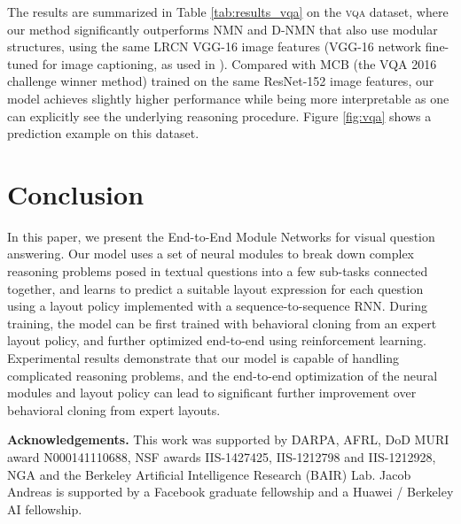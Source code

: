 \documentclass[10pt,twocolumn,letterpaper]{article}
\newcommand{\vqa}{\textsc{vqa}\xspace}
\newcommand{\myparagraph}[1]{\noindent\textbf{#1}}
\begin{document}
The results are summarized in Table \ref{tab:results_vqa} on the \vqa dataset, where our method significantly outperforms NMN \cite{andreas16neural} and D-NMN \cite{andreas2016learning} that also use modular structures, using the same LRCN VGG-16 image features (VGG-16 network fine-tuned for image captioning, as used in \cite{andreas16neural,andreas2016learning}). Compared with MCB \cite{fukui16emnlp} (the VQA 2016 challenge winner method) trained on the same ResNet-152 image features, our model achieves slightly higher performance while being more interpretable as one can explicitly see the underlying reasoning procedure. Figure \ref{fig:vqa} shows a prediction example on this dataset.

\section{Conclusion}

In this paper, we present the End-to-End Module Networks for visual question answering. Our model uses a set of neural modules to break down complex reasoning problems posed in textual questions into a few sub-tasks connected together, and learns to predict a suitable layout expression for each question using a layout policy implemented with a sequence-to-sequence RNN. During training, the model can be first trained with behavioral cloning from an expert layout policy, and further optimized end-to-end using reinforcement learning. Experimental results demonstrate that our model is capable of handling complicated reasoning problems, and the end-to-end optimization of the neural modules and layout policy can lead to significant further improvement over behavioral cloning from expert layouts.

\myparagraph{Acknowledgements.}
This work was supported by DARPA, AFRL, DoD MURI award N000141110688, NSF awards IIS-1427425, IIS-1212798 and IIS-1212928, NGA and the Berkeley Artificial Intelligence Research (BAIR) Lab. Jacob Andreas is supported by a Facebook graduate fellowship and a Huawei / Berkeley AI fellowship.

{\small


}
\end{document}
